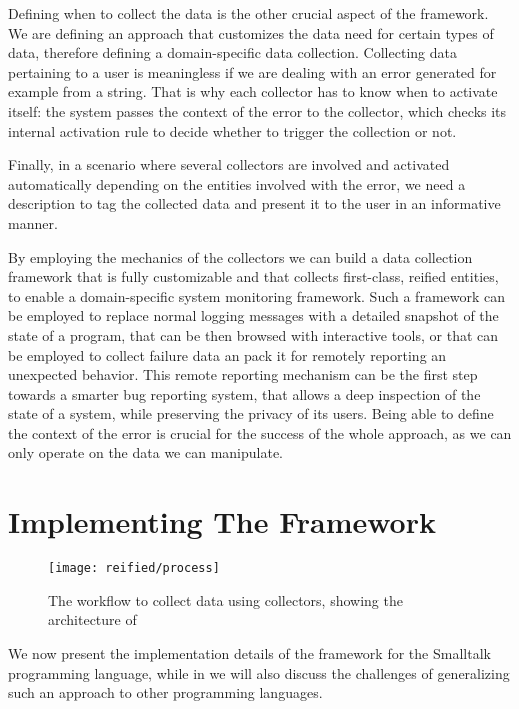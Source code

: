 Defining when to collect the data is the other crucial aspect of the framework.
We are defining an approach that customizes the data need for certain types of data, therefore defining a domain-specific data collection.
Collecting data pertaining to a user is meaningless if we are dealing with an error generated for example from a string.
That is why each collector has to know when to activate itself: the system passes the context of the error to the collector, which checks its internal activation rule to decide whether to trigger the collection or not.

Finally, in a scenario where several collectors are involved and activated automatically depending on the entities involved with the error, we need a description to tag the collected data and present it to the user in an informative manner.

By employing the mechanics of the collectors we can build a data collection framework that is fully customizable and that collects first-class, reified entities, to enable a domain-specific system monitoring framework.
Such a framework can be employed to replace normal logging messages with a detailed snapshot of the state of a program, that can be then browsed with interactive tools, or that can be employed to collect failure data an pack it for remotely reporting an unexpected behavior.
This remote reporting mechanism can be the first step towards a smarter bug reporting system, that allows a deep inspection of the state of a system, while preserving the privacy of its users.
Being able to define the context of the error is crucial for the success of the whole approach, as we can only operate on the data we can manipulate.


\section{Implementing The Framework} \label{sec:reified-implementation}

\begin{figure*}[ht]
  \centering
  \texttt{[image: reified/process]}
  \caption{The workflow to collect data using collectors, showing the architecture of \sln}
  \label{fig:architecture}
\end{figure*}

We now present the implementation details of the framework for the Smalltalk programming language, while in  we will also discuss the challenges of generalizing such an approach to other programming languages.


